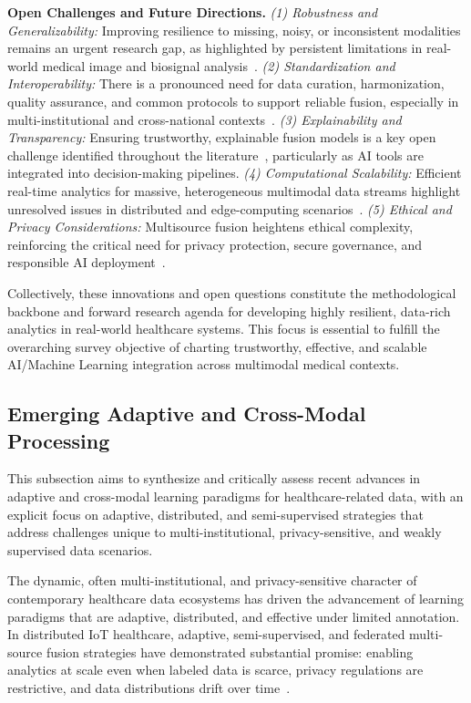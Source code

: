 \documentclass[sigconf]{acmart}
\begin{document}
\textbf{Open Challenges and Future Directions.} 
\textit{(1) Robustness and Generalizability:} Improving resilience to missing, noisy, or inconsistent modalities remains an urgent research gap, as highlighted by persistent limitations in real-world medical image and biosignal analysis~\cite{ref46,ref53,ref54,ref90}. 
\textit{(2) Standardization and Interoperability:} There is a pronounced need for data curation, harmonization, quality assurance, and common protocols to support reliable fusion, especially in multi-institutional and cross-national contexts~\cite{ref46,ref60,ref61,ref64,ref84}.
\textit{(3) Explainability and Transparency:} Ensuring trustworthy, explainable fusion models is a key open challenge identified throughout the literature~\cite{ref70,ref46,ref65,ref54,ref90}, particularly as AI tools are integrated into decision-making pipelines.
\textit{(4) Computational Scalability:} Efficient real-time analytics for massive, heterogeneous multimodal data streams highlight unresolved issues in distributed and edge-computing scenarios~\cite{ref84,ref106}.
\textit{(5) Ethical and Privacy Considerations:} Multisource fusion heightens ethical complexity, reinforcing the critical need for privacy protection, secure governance, and responsible AI deployment~\cite{ref70,ref84}.

Collectively, these innovations and open questions constitute the methodological backbone and forward research agenda for developing highly resilient, data-rich analytics in real-world healthcare systems. This focus is essential to fulfill the overarching survey objective of charting trustworthy, effective, and scalable AI/Machine Learning integration across multimodal medical contexts.

\subsection{Emerging Adaptive and Cross-Modal Processing}

This subsection aims to synthesize and critically assess recent advances in adaptive and cross-modal learning paradigms for healthcare-related data, with an explicit focus on adaptive, distributed, and semi-supervised strategies that address challenges unique to multi-institutional, privacy-sensitive, and weakly supervised data scenarios.

The dynamic, often multi-institutional, and privacy-sensitive character of contemporary healthcare data ecosystems has driven the advancement of learning paradigms that are adaptive, distributed, and effective under limited annotation. In distributed IoT healthcare, adaptive, semi-supervised, and federated multi-source fusion strategies have demonstrated substantial promise: enabling analytics at scale even when labeled data is scarce, privacy regulations are restrictive, and data distributions drift over time~\cite{ref105,ref106,ref107}. 
\end{document}
